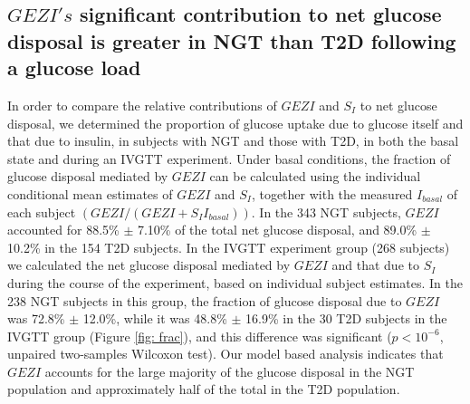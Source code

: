 \documentclass[utf8]{frontiersSCNS} %
\begin{document}
\subsection{$GEZI's$ significant contribution to net glucose disposal is  greater in NGT than T2D following a glucose load}
In order to compare the relative contributions of $GEZI$ and $S_I$ to net glucose disposal, we determined the proportion of glucose uptake due to glucose itself and that due to insulin, in subjects with NGT and those with T2D, in both the basal state and during an IVGTT experiment. Under basal conditions, the fraction of glucose disposal mediated by $GEZI$ can be calculated using the individual conditional mean estimates of $GEZI$ and $S_I$, together with the measured $I_{basal}$ of each subject $\left( {GEZI/\left( {GEZI + {S_I}{I_{basal}}} \right)} \right)$. In the 343 NGT subjects, $GEZI$ accounted for 88.5\% $\pm$ 7.10\% of the total net glucose disposal, and 89.0\% $\pm$ 10.2\% in the 154 T2D subjects. In the IVGTT experiment group (268 subjects) we calculated the net glucose disposal mediated by $GEZI$ and that due to $S_I$ during the course of the experiment, based on individual subject estimates. In the 238 NGT subjects in this group, the fraction of glucose disposal due to $GEZI$ was 72.8\% $\pm$ 12.0\%, while it was 48.8\% $\pm$ 16.9\% in the 30 T2D subjects in the IVGTT group (Figure \ref{fig: frac}), and this difference was significant ($p<10^{-6}$, unpaired two-samples Wilcoxon test). Our model based analysis indicates that $GEZI$ accounts for the large majority of the glucose disposal in the NGT population and approximately half of the total in the T2D population.  
\end{document}
